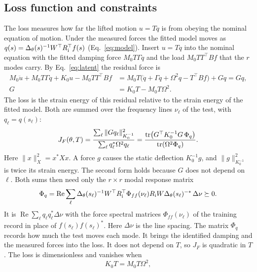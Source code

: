 \subsection{Loss function and constraints}
The loss measures how far the lifted motion $u=Tq$ is from obeying the
nominal equation of motion. Under the measured forces the fitted model
moves as $q(s)=\Delta_\theta(s)^{-1}W^{\top}R_{\rm i}^{\top}f(s)$
(Eq.~\eqref{eq:model}). Insert $u=Tq$ into the nominal equation with the
fitted damping force $M_0T\Gamma\dot q$ and the load $M_0TT^{\top}Bf$ that
the $r$ modes carry. By Eq.~\eqref{eq:latent} the residual force is
\begin{equation}
 \begin{aligned}
 M_0\ddot u+M_0T\Gamma\dot q+K_0u-M_0TT^{\top}Bf
 &=M_0T\bigl(\ddot q+\Gamma\dot q+\Omega^2q-T^{\top}Bf\bigr)+Gq=Gq,\\
 G&=K_0T-M_0T\Omega^2.
 \end{aligned}
 \label{eq:dynamic-defect}
\end{equation}
The loss is the strain energy of this residual relative to the strain
energy of the fitted model. Both are summed over the frequency lines
$\nu_\ell$ of the test, with $q_\ell=q(s_\ell)$:
\begin{equation}
 J_F(\theta,T)
 =\frac{\sum_\ell\|Gq_\ell\|_{K_0^{-1}}^2}{\sum_\ell q_\ell^*\Omega^2q_\ell}
 =\frac{\operatorname{tr}\bigl(G^{\top}K_0^{-1}G\,\Phi_q\bigr)}{\operatorname{tr}(\Omega^2\Phi_q)}.
 \label{eq:dynamic-objective}
\end{equation}
Here $\|x\|_X^2=x^*Xx$. A force $g$ causes the static deflection
$K_0^{-1}g$, and $\|g\|_{K_0^{-1}}^2$ is twice its strain energy. The second
form holds because $G$ does not depend on $\ell$. Both sums then need only
the $r\times r$ modal response matrix
\begin{equation}
 \Phi_q=\operatorname{Re}\sum_\ell\Delta_\theta(s_\ell)^{-1}W^{\top}R_{\rm i}^{\top}
 \Phi_{ff}(\nu_\ell)R_{\rm i}W\Delta_\theta(s_\ell)^{-*}\,\Delta\nu\succeq0.
 \label{eq:Pi}
\end{equation}
It is $\operatorname{Re}\sum_\ell q_\ell q_\ell^*\Delta\nu$ with the force
spectral matrices $\Phi_{ff}(\nu_\ell)$ of the training record in place of
$f(s_\ell)f(s_\ell)^*$. Here $\Delta\nu$ is the line spacing. The matrix
$\Phi_q$ records how much the test moves each mode. It brings the
identified damping and the measured forces into the loss. It does not
depend on $T$, so $J_F$ is quadratic in $T$. The loss is dimensionless and
vanishes when
\begin{equation}
 K_0T=M_0T\Omega^2,
 \label{eq:intertwining}
\end{equation}
